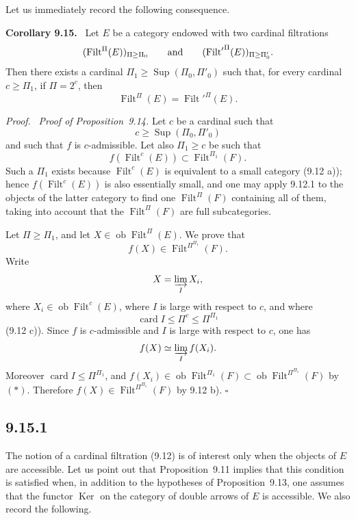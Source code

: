\documentclass[11pt]{article}
\newcommand{\ob}{\operatorname{ob}}
\newcommand{\Filt}{\operatorname{Filt}}
\newcommand{\Ker}{\operatorname{Ker}}
\newcommand{\Sup}{\operatorname{Sup}}
\newcommand{\card}{\operatorname{card}}
\newcommand{\qedtext}{\hfill\(\square\)}
\newenvironment{statement}[1]{\par\medskip\noindent\textbf{#1.}\ }{\par\medskip}
\newenvironment{prooftext}{\par\noindent\emph{Proof.}\ }{\par\medskip}
\begin{document}
Let us immediately record the following consequence.

\begin{statement}{Corollary 9.15}
Let $E$ be a category endowed with two cardinal filtrations
\[
(\Filt^\Pi(E))_{\Pi\geq\Pi_0}
\qquad\hbox{and}\qquad
({\Filt'}^\Pi(E))_{\Pi\geq\Pi'_0}.
\]
Then there exists a cardinal $\Pi_1\geq \Sup(\Pi_0,\Pi'_0)$ such that, for every cardinal $c\geq\Pi_1$, if $\Pi=2^c$, then
\[
 \Filt^\Pi(E)={\Filt'}^\Pi(E).
\]
\end{statement}

\begin{prooftext}
\emph{Proof of Proposition~9.14.}
Let $c$ be a cardinal such that
\[
 c\geq\Sup(\Pi_0,\Pi'_0)
\]
and such that $f$ is $c$-admissible. Let also $\Pi_1\geq c$ be such that
\begin{equation}
 f(\Filt^c(E))\subset \Filt^{\Pi_1}(F).
 \tag{$\ast$}
\end{equation}
Such a $\Pi_1$ exists because $\Filt^c(E)$ is equivalent to a small category (9.12 a)); hence $f(\Filt^c(E))$ is also essentially small, and one may apply 9.12.1 to the objects of the latter category to find one $\Filt^\Pi(F)$ containing all of them, taking into account that the $\Filt^\Pi(F)$ are full subcategories.

Let $\Pi\geq\Pi_1$, and let $X\in\ob\Filt^\Pi(E)$. We prove that
\[
 f(X)\in \Filt^{\Pi^{\Pi_1}}(F).
\]
Write
\[
 X=\varinjlim_I X_i,
\]
where $X_i\in\ob\Filt^c(E)$, where $I$ is large with respect to $c$, and where
\[
 \card I\leq \Pi^c\leq \Pi^{\Pi_1}
\]
(9.12 c)). Since $f$ is $c$-admissible and $I$ is large with respect to $c$, one has
\[
 f(X)\simeq \varinjlim_I f(X_i).
\]
Moreover $\card I\leq \Pi^{\Pi_1}$, and $f(X_i)\in\ob\Filt^{\Pi_1}(F)\subset\ob\Filt^{\Pi^{\Pi_1}}(F)$ by $(\ast)$. Therefore $f(X)\in\Filt^{\Pi^{\Pi_1}}(F)$ by 9.12 b). \qedtext
\end{prooftext}

\subsection*{9.15.1}

The notion of a cardinal filtration (9.12) is of interest only when the objects of $E$ are accessible. Let us point out that Proposition~9.11 implies that this condition is satisfied when, in addition to the hypotheses of Proposition~9.13, one assumes that the functor $\Ker$ on the category of double arrows of $E$ is accessible. We also record the following.
\end{document}
